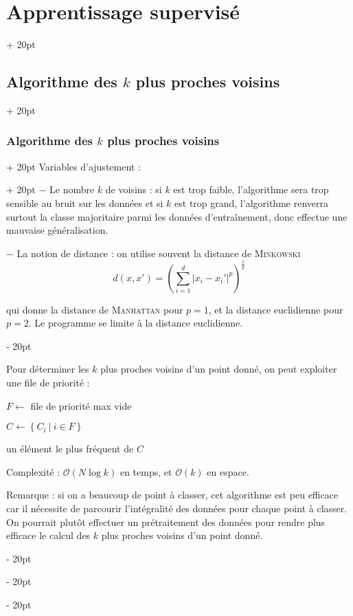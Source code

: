 \documentclass[a4paper, 12pt, twoside]{article}
\newenvironment{indalgo}[2][H]{
    \begin{algoBox}
        \begin{algorithm}[#1]
            \caption{#2}
}
{
        \end{algorithm}
    \end{algoBox}
}
\newcommand{\nset}[2]{\left\llbracket #1\ ;\ #2 \right\rrbracket}
\newcommand{\lr}[1]{\left( #1 \right)}
\newcommand{\set}[1]{\left\{ #1 \right\}}
\newcommand{\abs}[1]{\left\lvert #1 \right\rvert}
\newcommand{\ind}[1][20pt]{\advance\leftskip + #1}
\newcommand{\deind}[1][20pt]{\advance\leftskip - #1}
\newenvironment{indt}[2][20pt]{#2 \par \ind[#1]}{\par \deind} %
\begin{document}
\begin{indt}{\section{Apprentissage supervisé}}
\begin{indt}{\subsection{Algorithme des $k$ plus proches voisins}}
\begin{indt}{\subsubsection{Algorithme des $k$ plus proches voisins}}
\begin{indt}{Variables d'ajustement :}
                    $-$ Le nombre $k$ de voisins : si $k$ est trop faible, l'algorithme sera trop sensible au bruit sur les données et si $k$ est trop grand, l'algorithme renverra surtout la classe majoritaire parmi les données d'entraînement, donc effectue une mauvaise généralisation.

                    $-$ La notion de distance : on utilise souvent la distance de \textsc{Minkowski}
                    \[
                        d(x, x') = \lr{\sum_{i = 1}^d \abs{x_i - x_i'}^p}^{\tfrac 1 p}
                    \]

                    qui donne la distance de \textsc{Manhattan} pour $p = 1$, et la distance euclidienne pour $p = 2$.
                    Le programme se limite à la distance euclidienne.
                \end{indt}

                Pour déterminer les $k$ plus proches voisins d'un point donné, on peut exploiter une file de priorité :

                \begin{indalgo}{Algorithme des $k$ plus proches voisins}
                    \KwInput{données d'entraînement $\lr{x_i, y_i}_{i \in \nset 1 N}$}

                    \BlankLine

                    $F \gets$ file de priorité max vide\;



                    $C \gets \set{C_i\ |\ i \in F}$\;

                    \Return un élément le plus fréquent de $C$\;
                \end{indalgo}

                Complexité : $\mathcal O(N\log k)$ en temps, et $\mathcal O(k)$ en espace.

                \vspace{12pt}
                
                Remarque : si on a beaucoup de point à classer, cet algorithme est peu efficace car il nécessite de parcourir l'intégralité des données pour chaque point à classer. On pourrait plutôt effectuer un prétraitement des données pour rendre plus efficace le calcul des $k$ plus proches voisins d'un point donné.
            \end{indt}


\end{indt}
\end{indt}
\end{document}
